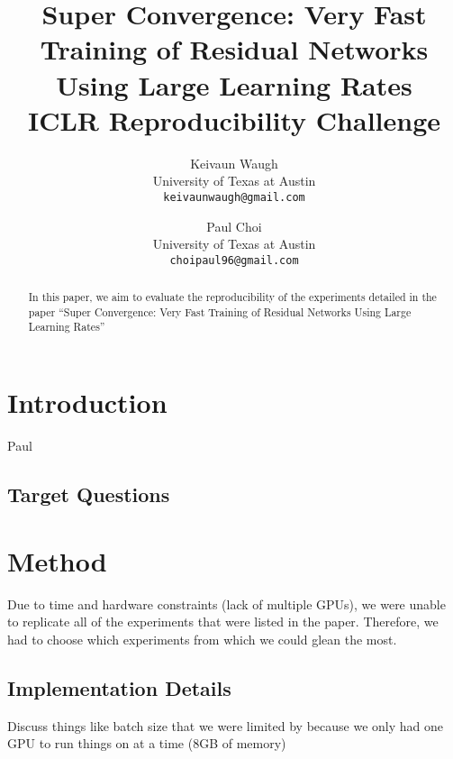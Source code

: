 \documentclass[10pt,twocolumn,letterpaper]{article}
\begin{document}
\title{
    Super Convergence: Very Fast Training of Residual Networks Using Large
    Learning Rates\\
    \large ICLR Reproducibility Challenge}

\author{Keivaun Waugh\\
University of Texas at Austin\\
{\tt\small keivaunwaugh@gmail.com}
\and
Paul Choi\\
University of Texas at Austin\\
{\tt\small choipaul96@gmail.com}
}

\maketitle

\begin{abstract}
In this paper, we aim to evaluate the reproducibility of the experiments
    detailed in the paper ``Super Convergence: Very Fast Training of Residual
    Networks Using Large Learning Rates'' \cite{SuperConvergence}
\end{abstract}

\section{Introduction}
Paul

\subsection{Target Questions}

\section{Method}
\label{sec:method}
Due to time and hardware constraints (lack of multiple GPUs), we were unable to replicate all of the experiments that were listed in the paper. Therefore, we had to choose which experiments from which we could glean the most. 

\subsection{Implementation Details}
Discuss things like batch size that we were limited by because we only had
one GPU to run things on at a time (8GB of memory)
\end{document}
